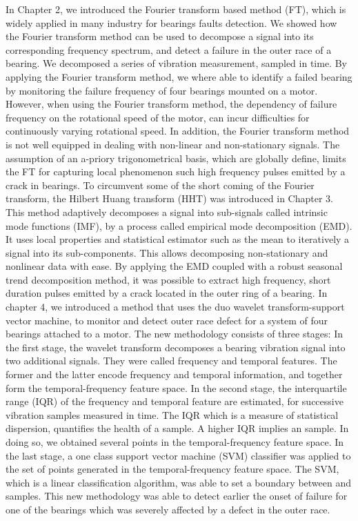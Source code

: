 \documentclass[thesis.tex]{subfiles}
\begin{document}
	\justify
	In Chapter 2, we introduced the Fourier transform based method (FT), which is widely applied in many industry for bearings faults detection. We showed how the Fourier transform method can be used to decompose a signal into its corresponding frequency spectrum, and detect a failure in the outer race of a bearing. We decomposed a series of vibration measurement, sampled in time. By applying the Fourier transform method, we where able to identify a failed bearing by monitoring the failure frequency of four bearings mounted on a motor.
	\justify
	However, when using the Fourier transform method, the dependency of failure frequency on the rotational speed of the motor, can incur difficulties for continuously varying rotational speed. In addition, the Fourier transform method is not well equipped in dealing with non-linear and non-stationary signals. The assumption of an a-priory trigonometrical basis, which are globally define, limits the FT for capturing local phenomenon such high frequency pulses emitted by a crack in bearings.
	\justify
	To circumvent some of the short coming of the Fourier transform, the Hilbert Huang transform (HHT) was introduced in Chapter 3.
	This method adaptively decomposes a signal into sub-signals called intrinsic mode functions (IMF), by a process called empirical mode decomposition (EMD). It uses local properties and statistical estimator such as the mean to iteratively
	 a signal into its sub-components. This allows decomposing non-stationary and nonlinear data with ease.
	By applying the EMD coupled with a robust seasonal trend decomposition method, it was possible to extract high frequency, short duration pulses emitted by a crack located in the outer ring of a bearing.
	\justify
	In chapter 4, we introduced a method that uses the duo wavelet transform-support vector machine, to monitor and detect outer race defect for a system of four bearings attached to a motor. The new methodology consists of three stages: In the first stage, the wavelet transform decomposes a bearing vibration signal into two additional signals. They were called frequency and temporal features. The former and the latter encode frequency and temporal information, and together form the temporal-frequency feature space. In the second stage, the interquartile range (IQR) of the frequency and temporal feature are estimated, for successive vibration samples measured in time. The IQR which is a measure of statistical dispersion, quantifies the health of a sample. A higher IQR implies an  sample. In doing so, we obtained several points in the temporal-frequency feature space.
	\justify
	In the last stage, a one class support vector machine (SVM) classifier was applied to the set of points generated in the temporal-frequency feature space. The SVM, which is a linear classification algorithm, was able to set a boundary between  and  samples.
	This new methodology was able to detect earlier the onset of failure for one of the bearings which was severely affected by a defect in the outer race.
	
\end{document}
